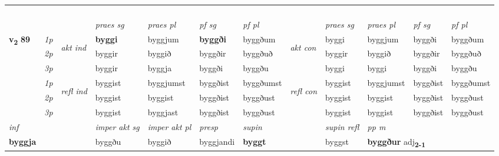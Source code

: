 \begin{longtable}[l]{X>{\footnotesize\itshape}llXXXXlXXXX}
\midrule
 & \\*
   & \\*
   & \\*
  & \\
   \midrule

 & &   & \textit{praes sg}  & \textit{praes pl}    & \textit{ pf sg} & \textit{pf pl} & & \textit{praes sg}  & \textit{praes pl}    & \textit{pf sg} & \textit{pf pl }  \\ \cmidrule{4-7} \cmidrule{9-12}
 \multirow{2}{*}{{{\textbf{v{\textsubscript{2}}} \Large{\textbf{89}}}}}  & 1p & \multirow{3}{*}{\begin{turn}{90}\textit{akt ind}\end{turn}} & \textbf{byggi} & byggjum & \textbf{byggði} & byggðum & \multirow{3}{*}{\begin{turn}{90}\textit{akt con}\end{turn}} &byggi & byggjum & byggði & byggðum\\*
 & 2p &  &  byggir  & byggið & byggðir & byggðuð & & byggir & byggið & byggðir & byggðuð \\*
 & 3p &  & byggir & byggja & byggði & byggðu & & byggi & byggi& byggði & byggðu \\*
\cmidrule{4-7} \cmidrule{9-12}
 & 1p & \multirow{3}{*}{\begin{turn}{90}\textit{refl ind}\end{turn}}  & byggist & byggjumst & byggðist & byggðumst & \multirow{3}{*}{\begin{turn}{90}\textit{refl con}\end{turn}}  &byggist & byggjumst & byggðist & byggðumst \\*
 & 2p &  & byggist & byggist & byggðist & byggðust & &byggist & byggist & byggðist & byggðust \\*
 & 3p  & & byggist & byggjast & byggðist & byggðust & & byggist & byggist& byggðist & byggðust \\*
\cmidrule{4-7} \cmidrule{9-12}

   {\textit{inf}} & &  & \textit{imper akt sg} & \textit{imper akt pl}   & \textit{presp} & \textit{supin} && \textit{supin refl} & \textit{pp m} \\*
  {\textbf{byggja}} & && byggðu  & byggið   & byggjandi &  \textbf{byggt} && byggst & \multicolumn{2}{l}{\textbf{byggður} adj\textbf{\textsubscript{2-1}}} \\*

\midrule


\end{longtable}
